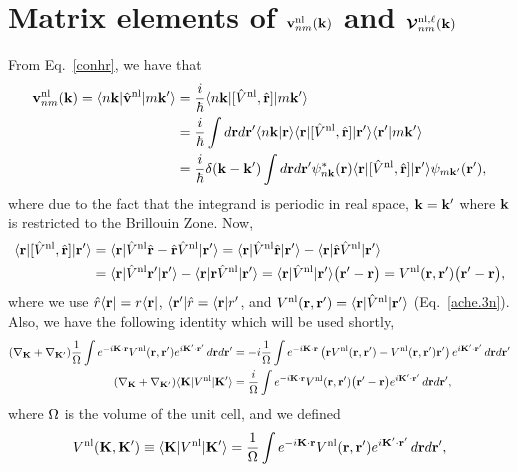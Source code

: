 \section{Matrix elements of 
\texorpdfstring{$\bfv^\nl_{nm}(\bfk)$}{Vnonlocal}
and
\texorpdfstring{$\calbv^{\nl,\ell}_{nm}(\bfk)$}{Vnonlocal}
}\label{appvnl}
From Eq.~\eqref{conhr}, we have that
\begin{align}\label{vnln.0}
\bfv^\nl_{nm}(\bfk)=\bra{n\bfk}\hat\bfv^\nl\ket{m\bfk'}
&=
\frac{i}{\hbar}
\bra{n\bfk}[\hat V^\nl,\hat\bfr]\ket{m\bfk'}
\nonumber\\
&=
\frac{i}{\hbar}
\int d\bfr d\bfr'
\braket{n\bfk}{\bfr}
\bra{\bfr}
[\hat V^\nl,\hat \bfr]
\ket{\bfr'}
\braket{\bfr'}{m\bfk'}
\nonumber\\
&=
\frac{i}{\hbar}
\gd(\bfk-\bfk')
\int d\bfr d\bfr'
\psi^*_{n\bfk}(\bfr)
\bra{\bfr}
[\hat V^\nl,\hat \bfr]
\ket{\bfr'}
\psi_{m\bfk'}(\bfr')
,
\end{align}   
where due to the fact that the integrand is periodic in real space,
$\bfk=\bfk'$ where $\bfk$ is restricted to the Brillouin Zone.
Now,
\begin{align}\label{vnln.1}
\bra{\bfr}
[\hat V^\nl,\hat \bfr]
\ket{\bfr'}
&=
\bra{\bfr}
\hat V^\nl\hat \bfr
-
\hat \bfr\hat V^\nl
\ket{\bfr'}
=
\bra{\bfr}
\hat V^\nl\hat \bfr
\ket{\bfr'}
-
\bra{\bfr}
\hat \bfr\hat V^\nl
\ket{\bfr'}
\nonumber\\
&=
\bra{\bfr}
\hat V^\nl \bfr'
\ket{\bfr'}
-
\bra{\bfr}
\bfr\hat V^\nl
\ket{\bfr'}
=
\bra{\bfr}
\hat V^\nl
\ket{\bfr'}
\big(\bfr'-\bfr\big)
=V^\nl(\bfr,\bfr') \big(\bfr'-\bfr\big)
,
\end{align}
where we use 
$\hat r \bra{\bfr}=r \bra{\bfr}$,
$\bra{\bfr'}\hat r=\bra{\bfr}r'$,
and $V^\nl(\bfr,\bfr')=\bra{\bfr}\hat V^\nl\ket{\bfr'}$ (Eq.~\eqref{ache.3n}).
Also, we have the following identity which will be used shortly, 
\begin{align}\label{cn51}
(\nabla_\bfK+\nabla_{\bfK'})
\frac{1}{\gO}
\int e^{-i\bfK\cdot\bfr}
V^\nl(\bfr,\bfr')
e^{i\bfK'\cdot\bfr'}
\,d\bfr d\bfr'
&=
-i
\frac{1}{\gO}
\int e^{-i\bfK\cdot\bfr}
\left(
\bfr
V^\nl(\bfr,\bfr')
-
V^\nl(\bfr,\bfr')
\bfr'
\right)
e^{i\bfK'\cdot\bfr'}
\,d\bfr d\bfr'
\nonumber\\
(\nabla_\bfK+\nabla_{\bfK'})
\bra{\bfK}
V^\nl
\ket{\bfK'}
&=
\frac{i}{\gO}
\int e^{-i\bfK\cdot\bfr}
V^\nl(\bfr,\bfr')
\big(
\bfr'
-
\bfr
\big)
e^{i\bfK'\cdot\bfr'}
\,d\bfr d\bfr'
,
\end{align}
where $\gO$ is the volume of the unit cell,  
and we defined
\begin{align}\label{cn52}
V^\nl(\bfK,\bfK') 
\equiv
\bra{\bfK}
V^\nl
\ket{\bfK'}
=
\frac{1}{\gO}
\int e^{-i\bfK\cdot\bfr}
V^\nl(\bfr,\bfr')
e^{i\bfK'\cdot\bfr'}
\,d\bfr d\bfr'
,
\end{align}
